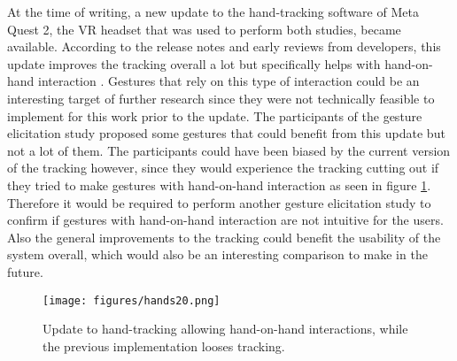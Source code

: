 At the time of writing, a new update to the hand-tracking software of Meta Quest 2, the VR headset that was used to perform both studies, became available. According to the release notes and early reviews from developers, this update improves the tracking overall a lot but specifically helps with hand-on-hand interaction \cite{handstwoupdate}. Gestures that rely on this type of interaction could be an interesting target of further research since they were not technically feasible to implement for this work prior to the update. The participants of the gesture elicitation study proposed some gestures that could benefit from this update but not a lot of them. The participants could have been biased  by the current version of the tracking however, since they would experience the tracking cutting out if they tried to make gestures with hand-on-hand interaction as seen in figure \ref{fig:hands20}. Therefore it would be required to perform another gesture elicitation study to confirm if gestures with hand-on-hand interaction are not intuitive for the users. Also the general improvements to the tracking could benefit the usability of the system overall, which would also be an interesting comparison to make in the future. 

\begin{figure}[!ht]
    \centering
    \texttt{[image: figures/hands20.png]}
    \caption{Update to hand-tracking allowing hand-on-hand interactions, while the previous implementation looses tracking.}
    \label{fig:hands20}
\end{figure}


